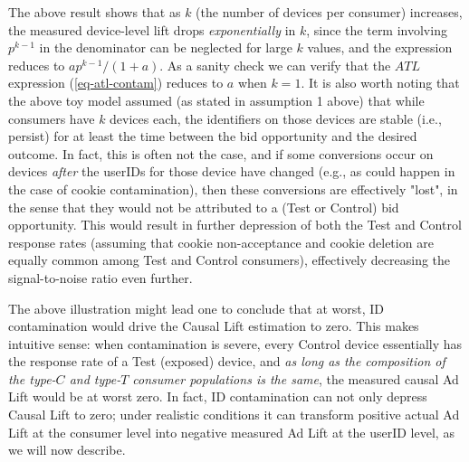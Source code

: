 \documentclass[11pt,a4paper]{article}
\theoremstyle{definition}
\theoremstyle{remark}
\theoremstyle{definition}
\theoremstyle{definition}
\theoremstyle{definition}
\theoremstyle{definition}
\theoremstyle{definition}
\theoremstyle{definition}
\begin{document}
The above result shows that as $k$ (the number of devices per consumer) increases, the measured device-level lift drops \textit{exponentially} in $k$, since the term involving $p^{k-1}$ in the denominator can be neglected for large $k$ values, and the expression reduces to $a p^{k-1}/(1 + a)$. As a sanity check we can verify that the $ATL$ expression (\ref{eq-atl-contam}) reduces to $a$ when $k=1$. It is also worth noting that the above toy model assumed (as stated in assumption 1 above) that while consumers have $k$ devices each, the identifiers on those devices are stable (i.e., persist) for at least the time between the bid opportunity and the desired outcome. In fact, this is often not the case, and if some conversions occur on devices {\em after} the userIDs for those device have changed (e.g., as could happen in the case of cookie contamination), then these conversions are effectively "lost", in the sense that they would not be attributed to a (Test or Control) bid opportunity. This would result in further depression of both the Test and Control response rates (assuming that cookie non-acceptance and cookie deletion are equally common among Test and Control consumers), effectively decreasing the signal-to-noise ratio even further.

The above illustration might lead one to conclude that at worst, ID contamination would drive the Causal Lift estimation to zero. This makes intuitive sense: when contamination is severe, every Control device essentially has the response rate of a Test (exposed) device, and \textit{as long as the composition of the type-$C$ and type-$T$ consumer populations is the same}, the measured causal Ad Lift would be at worst zero. In fact, ID contamination can not only depress Causal Lift to zero; under realistic conditions it can transform positive actual Ad Lift at the consumer level into negative measured Ad Lift at the userID level, as we will now describe.
\end{document}
